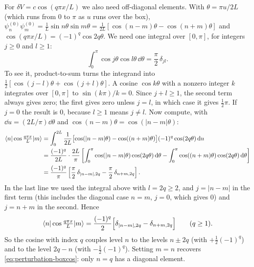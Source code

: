 For $\delta V=c\cos(q\pi x/L)$ we also need off-diagonal elements. With $\theta=\pi u/2L$ (which runs from 0 to $\pi$ as $u$ runs over the box), $\psi_n^{(0)}\psi_m^{(0)}=\tfrac1L\sin n\theta\sin m\theta=\tfrac{1}{2L}[\cos(n-m)\theta-\cos(n+m)\theta]$ and $\cos(q\pi x/L)=(-1)^q\cos2q\theta$. We need one integral over $[0,\pi]$, for integers $j\ge0$ and $l\ge1$:
\[
\int_0^\pi\cos j\theta\cos l\theta\,\dd\theta=\frac\pi2\,\delta_{jl}.
\]
To see it, product-to-sum turns the integrand into $\tfrac12[\cos(j-l)\theta+\cos(j+l)\theta]$. A cosine $\cos k\theta$ with a nonzero integer $k$ integrates over $[0,\pi]$ to $\sin(k\pi)/k=0$. Since $j+l\ge1$, the second term always gives zero; the first gives zero unless $j=l$, in which case it gives $\tfrac12\pi$. If $j=0$ the result is $0$, because $l\ge1$ means $j\ne l$. Now compute, with $\dd u=(2L/\pi)\dd\theta$ and $\cos(n-m)\theta=\cos(|n-m|\theta)$:
\begin{align*}
\langle n|\cos\tfrac{q\pi x}{L}|m\rangle
&=\int_0^{2L}\frac{1}{2L}\bigl[\cos(|n-m|\theta)-\cos((n+m)\theta)\bigr](-1)^q\cos(2q\theta)\,\mathrm{d} u\\
&=\frac{(-1)^q}{2L}\cdot\frac{2L}{\pi}\left[\int_0^\pi\cos(|n-m|\theta)\cos(2q\theta)\,\mathrm{d}\theta-\int_0^\pi\cos((n+m)\theta)\cos(2q\theta)\,\mathrm{d}\theta\right]\\
&=\frac{(-1)^q}{\pi}\left[\frac\pi2\,\delta_{|n-m|,2q}-\frac\pi2\,\delta_{n+m,2q}\right].
\end{align*}
In the last line we used the integral above with $l=2q\ge2$, and $j=|n-m|$ in the first term (this includes the diagonal case $n=m$, $j=0$, which gives $0$) and $j=n+m$ in the second. Hence
\begin{equation}
\langle n|\cos\tfrac{q\pi x}{L}|m\rangle=\frac{(-1)^q}{2}\Bigl[\delta_{|n-m|,2q}-\delta_{n+m,2q}\Bigr]\qquad(q\ge1).
\label{eq:perturbation-cosmat}
\end{equation}
So the cosine with index $q$ couples level $n$ to the levels $n\pm2q$ (with $+\tfrac12(-1)^q$) and to the level $2q-n$ (with $-\tfrac12(-1)^q$). Setting $m=n$ recovers \cref{eq:perturbation-boxcos}: only $n=q$ has a diagonal element.

